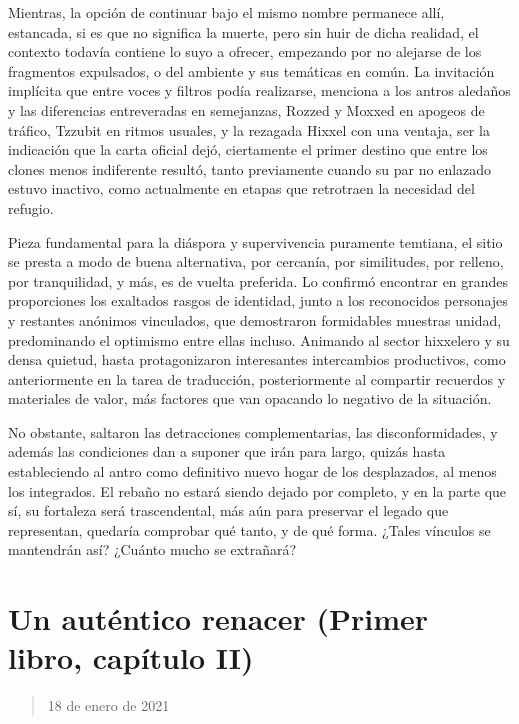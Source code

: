\documentclass[
]{book}
\begin{document}
Mientras, la opción de continuar bajo el mismo nombre permanece allí, estancada, si es que no significa la muerte, pero sin huir de dicha realidad, el contexto todavía contiene lo suyo a ofrecer, empezando por no alejarse de los fragmentos expulsados, o del ambiente y sus temáticas en común. La invitación implícita que entre voces y filtros podía realizarse, menciona a los antros aledaños y las diferencias entreveradas en semejanzas, Rozzed y Moxxed en apogeos de tráfico, Tzzubit en ritmos usuales, y la rezagada Hixxel con una ventaja, ser la indicación que la carta oficial dejó, ciertamente el primer destino que entre los clones menos indiferente resultó, tanto previamente cuando su par no enlazado estuvo inactivo, como actualmente en etapas que retrotraen la necesidad del refugio.

Pieza fundamental para la diáspora y supervivencia puramente temtiana, el sitio se presta a modo de buena alternativa, por cercanía, por similitudes, por relleno, por tranquilidad, y más, es de vuelta preferida. Lo confirmó encontrar en grandes proporciones los exaltados rasgos de identidad, junto a los reconocidos personajes y restantes anónimos vinculados, que demostraron formidables muestras unidad, predominando el optimismo entre ellas incluso. Animando al sector hixxelero y su densa quietud, hasta protagonizaron interesantes intercambios productivos, como anteriormente en la tarea de traducción, posteriormente al compartir recuerdos y materiales de valor, más factores que van opacando lo negativo de la situación.

No obstante, saltaron las detracciones complementarias, las disconformidades, y además las condiciones dan a suponer que irán para largo, quizás hasta estableciendo al antro como definitivo nuevo hogar de los desplazados, al menos los integrados. El rebaño no estará siendo dejado por completo, y en la parte que sí, su fortaleza será trascendental, más aún para preservar el legado que representan, quedaría comprobar qué tanto, y de qué forma. ¿Tales vínculos se mantendrán así? ¿Cuánto mucho se extrañará?

\hypertarget{un-autuxe9ntico-renacer-primer-libro-capuxedtulo-ii}{%
\section{Un auténtico renacer (Primer libro, capítulo II)}\label{un-autuxe9ntico-renacer-primer-libro-capuxedtulo-ii}}

\begin{quote}
18 de enero de 2021
\end{quote}
\end{document}
